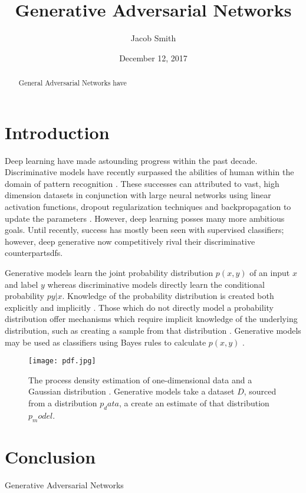 \documentclass[11pt]{article}
\title{Generative Adversarial Networks}
\author{Jacob Smith}
\date{December 12, 2017}
\begin{document}
\maketitle

\begin{abstract}
    General Adversarial Networks have
\end{abstract}

\section{Introduction}
Deep learning have made astounding progress within the past decade. Discriminative models have recently surpassed the abilities of human within the domain of pattern recognition \citep{2014arXiv1404.7828S}. These successes can attributed to vast, high dimension datasets in conjunction with large neural networks using linear activation functions, dropout regularization techniques and backpropagation to update the parameters \citep{2014arXiv1406.2661G}. However, deep learning posses many more ambitious goals. Until recently, success has mostly been seen with supervised classifiers; however, deep generative now competitively rival their discriminative counterpartsdfs.

Generative models learn the joint probability distribution $p(x,y)$ of an input $x$ and label $y$ whereas discriminative models directly learn the conditional probability $p{y|x}$. Knowledge of the probability distribution is created both explicitly and implicitly \citep{Goodfellow-et-al-2016}. Those which do not directly model a probability distribution offer mechanisms which require implicit knowledge of the underlying distribution, such as creating a sample from that distribution \citep{Goodfellow-et-al-2016}. Generative models may be used as classifiers using Bayes rules to calculate $p(x,y)$ \citep{NIPS2001_2020}.

\begin{figure}[h!]
\centering
\texttt{[image: pdf.jpg]}
\caption{The process density estimation of one-dimensional data and a Gaussian distribution \citep{2017arXiv170100160G}. Generative models take a dataset $D$, sourced from a distribution $p_data$, a create an estimate of that distribution $p_model$.}
\label{fig:pdf}
\end{figure}

\section{Conclusion}
Generative Adversarial Networks



\end{document}
